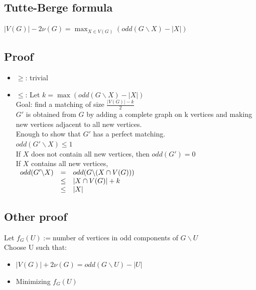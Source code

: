         \subsection{Tutte-Berge formula}
            $|V(G)|-2\nu(G)=\max_{X\in V(G)}(odd(G\backslash X)-|X|)$
        \subsection{Proof}
            \begin{itemize}
                \item $\geq$: trivial
                \item $\leq$: Let $k=\max(odd(G\backslash X)-|X|)$\\
                    Goal: find a matching of size $\frac{|V(G)|-k}{2}$\\
                    $G'$ is obtained from $G$ by adding a complete graph on k vertices and making new vertices adjacent to all new vertices.\\
                    Enough to show that $G'$ has a perfect matching.\\
                    $odd(G'\backslash X)\leq 1$\\
                    If $X$ does not contain all new vertices, then $odd(G')=0$\\
                    If $X$ contains all new vertices,\\
                    $\begin{array}{r c l}
                        odd(G'\backslash X) &=& odd(G\backslash (X\cap V(G)))\\
                        &\leq&|X\cap V(G)|+k\\
                        &\leq&|X|
                    \end{array}$
            \end{itemize}
        \subsection{Other proof}
            Let $f_G(U):=$number of vertices in odd components of $G\backslash U$\\
            Choose U such that:\\
            \begin{itemize}
                \item $|V(G)|+2\nu(G)=odd(G\backslash U)-|U|$\\
                \item Minimizing $f_G(U)$
            \end{itemize}
